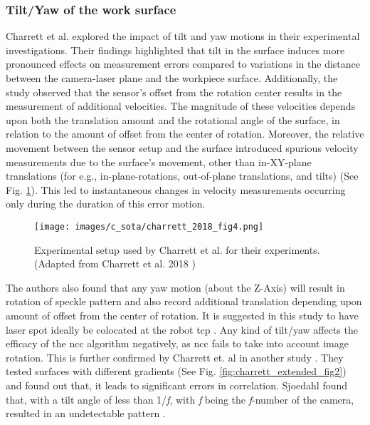     \subsubsection{Tilt/Yaw of the work surface}\label{subsubsection:tilt_yaw}
    Charrett et al. \cite{charrett_2018} explored the impact of tilt and yaw motions in their experimental investigations. Their findings highlighted that tilt in the surface induces more pronounced effects on measurement errors compared to variations in the distance between the camera-laser plane and the workpiece surface. Additionally, the study observed that the sensor's offset from the rotation center results in the measurement of additional velocities. The magnitude of these velocities depends upon both the translation amount and the rotational angle of the surface, in relation to the amount of offset from the center of rotation. Moreover, the relative movement between the sensor setup and the surface introduced spurious velocity measurements due to the surface's movement, other than in-XY-plane translations (for e.g., in-plane-rotations, out-of-plane translations, and tilts) (See Fig. \ref{fig:charrett_2018_fig4}). This led to instantaneous changes in velocity measurements occurring only during the duration of this error motion.

    \begin{figure}[h]
        \centering
        \texttt{[image: images/c\_sota/charrett\_2018\_fig4.png]}
        \caption{Experimental setup used by Charrett et al. for their experiments. (Adapted from Charrett et al. 2018 \cite{charrett_2018})}
        \label{fig:charrett_2018_fig4}
    \end{figure}

    \noindent The authors also found that any yaw motion (about the Z-Axis) will result in rotation of speckle pattern and also record additional translation depending upon amount of offset from the center of rotation. It is suggested in this study to have laser spot ideally be colocated at the robot \gls{tcp} \cite{charrett_2018}. Any kind of tilt/yaw affects the efficacy of the \gls{ncc} algorithm negatively, as \gls{ncc} fails to take into account image rotation. This is further confirmed by Charrett et. al in another study \cite{charrett_extended_theory}. They tested surfaces with different gradients (See Fig. \ref{fig:charrett_extended_fig2}) and found out that, it leads to significant errors in correlation. Sjoedahl found that, with a tilt angle of less than 1/\emph{f}, with \emph{f} being the \emph{f}-number of the camera, resulted in an undetectable pattern \cite{sjoedahl}.
    
